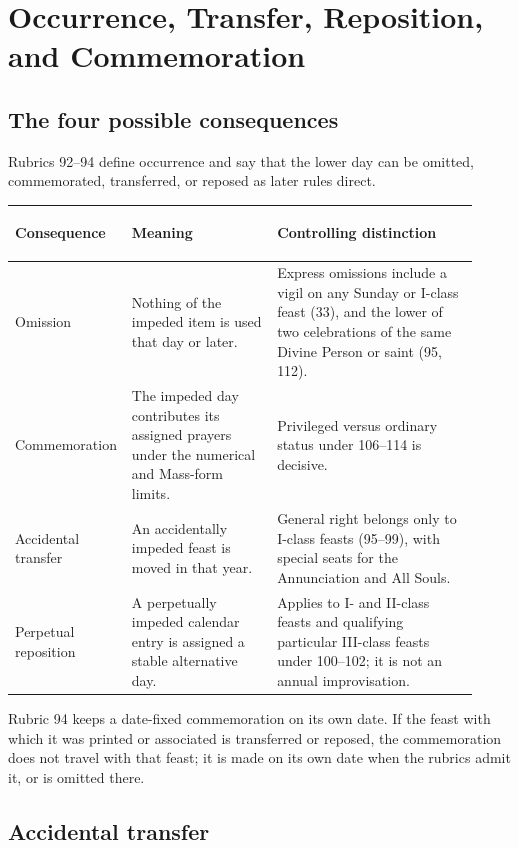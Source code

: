 \section{Occurrence, Transfer, Reposition, and Commemoration}

\subsection{The four possible consequences}

Rubrics 92--94 define occurrence and say that the lower day can be omitted, commemorated, transferred, or reposed as later rules direct.

\begin{longtable}{>{\bfseries\raggedright\arraybackslash}p{0.18\linewidth}>{\raggedright\arraybackslash}p{0.31\linewidth}>{\raggedright\arraybackslash}p{0.43\linewidth}}
\toprule
Consequence & Meaning & Controlling distinction\\
\midrule
\endhead
Omission & Nothing of the impeded item is used that day or later. & Express omissions include a vigil on any Sunday or I-class feast (33), and the lower of two celebrations of the same Divine Person or saint (95, 112).\\
Commemoration & The impeded day contributes its assigned prayers under the numerical and Mass-form limits. & Privileged versus ordinary status under 106--114 is decisive.\\
Accidental transfer & An accidentally impeded feast is moved in that year. & General right belongs only to I-class feasts (95--99), with special seats for the Annunciation and All Souls.\\
Perpetual reposition & A perpetually impeded calendar entry is assigned a stable alternative day. & Applies to I- and II-class feasts and qualifying particular III-class feasts under 100--102; it is not an annual improvisation.\\
\bottomrule
\end{longtable}

Rubric 94 keeps a date-fixed commemoration on its own date. If the feast with which it was printed or associated is transferred or reposed, the commemoration does not travel with that feast; it is made on its own date when the rubrics admit it, or is omitted there.

\subsection{Accidental transfer}

